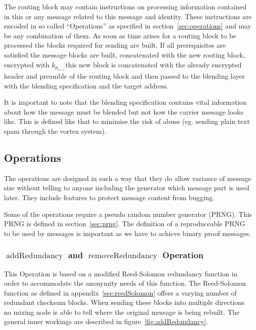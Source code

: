 \documentclass[9pt,journal,compsoc]{IEEEtran}
\DeclareMathOperator{\addRedundancy}{addRedundancy}
\DeclareMathOperator{\removeRedundancy}{removeRedundancy}
\begin{document}
The routing block may contain instructions on processing information contained in this or any message related to this message and identity. These instructions are encoded in so called ``Operations'' as specified in section~\ref{sec:operations} and may be any combination of them. As soon as time arises for a routing block to be processed the blocks required for sending are built. If all prerequisites are satisfied the message blocks are built, concatenated with the new routing block, encrypted with $k_{p_{i+1}}$this new block is concatenated with the already encrypted header and preamble of the routing block and then passed to the blending layer with the blending specification and the target address.

It is important to note that the blending specification contains vital information about how the message must be blended but not how the carrier message looks like. This is defined like that to minimise the risk of abuse (eg. sending plain text spam through the vortex system).

\subsection{Operations\label{sec:operations}}
The operations are designed in such a way that they do allow  variance of message size without telling to anyone including the generator which message part is used later. They include features to protect message content from bugging.

Some of the operations require a pseudo random number generator (PRNG). This PRNG is defined in section~\ref{sec:prng}. The definition of a reproduceable PRNG to be used by messages is important as we have to achieve binary proof messages.

\subsubsection{$\addRedundancy$ and $\removeRedundancy$ Operation}
This Operation is based on a modified Reed-Solomon redundancy function in order to accommodate the anonymity needs of this function. The Reed-Solomon function as defined in appendix~\ref{sec:reedSolomon} offers a varying number of redundant checksum blocks. When sending these blocks into multiple directions no mixing node is able to tell where the original message is being rebuilt. The general inner workings are described in figure~\ref{fig:addRedundancy}.
\end{document}
